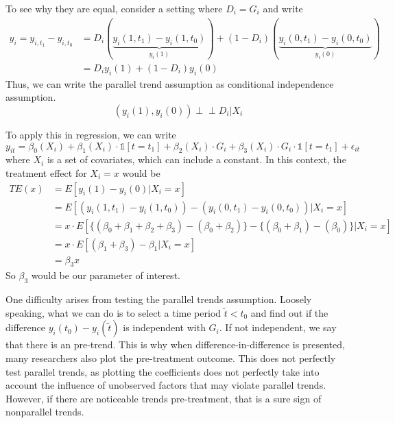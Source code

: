 \documentclass[12pt]{article}
\theoremstyle{definition}
\theoremstyle{property}
\theoremstyle{assumption}
\theoremstyle{example}
\theoremstyle{comment}
\begin{document}
To see why they are equal, consider a setting where $D_i=G_i$ and write
\begin{align*}
y_i = y_{i,t_1}-y_{i,t_0}&=D_i(\underbrace{y_i(1,t_1)-y_i(1,t_0)}_{y_i(1)})+(1-D_i)(\underbrace{y_i(0,t_1)-y_i(0,t_0)}_{y_i(0)})\\
&=D_iy_i(1) + (1-D_i)y_i(0)
\end{align*}
Thus, we can write the parallel trend assumption as conditional independence assumption. 
\[
(y_i(1), y_i(0)) \perp\!\!\! \perp D_i|X_i
\]
\par
To apply this in regression, we can write
\[
y_{it}=\beta_0(X_i)+\beta_1(X_i)\cdot\mathbb{1}[t=t_1]+\beta_2(X_i)\cdot G_i + \beta_3(X_i)\cdot G_i\cdot\mathbb{1}[t=t_1]+\epsilon_{it}
\]
where $X_i$ is a set of covariates, which can include a constant. In this context, the treatment effect for $X_i=x$ would be
\begin{align*}
TE(x)&=E[y_i(1)-y_i(0)|X_i=x]\\
&=E[(y_i(1,t_1)-y_i(1,t_0))-(y_i(0,t_1)-y_i(0,t_0))|X_i=x]\\
&=x\cdot E[\{(\beta_0+\beta_1+\beta_2+\beta_3)-(\beta_0+\beta_2)\}-\{(\beta_0+\beta_1)-(\beta_0)\}|X_i=x]\\
&=x\cdot E[(\beta_1+\beta_3)-\beta_1|X_i=x]\\
&=\beta_3 x
\end{align*}
So $\beta_3$ would be our parameter of interest. \par
One difficulty arises from testing the parallel trends assumption. Loosely speaking, what we can do is to select a time period $\tilde{t}<t_0$ and find out if the difference $y_i(t_0)-y_i(\tilde{t})$ is independent with $G_i$. If not independent, we say that there is an pre-trend. This is why when difference-in-difference is presented, many researchers also plot the pre-treatment outcome. This does not perfectly test parallel trends, as plotting the coefficients does not perfectly take into account the influence of unobserved factors that may violate parallel trends. However, if there are noticeable trends pre-treatment, that is a sure sign of nonparallel trends. 
\end{document}
